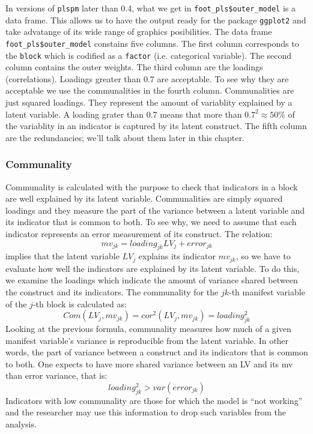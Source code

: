 \documentclass[12pt]{book}\usepackage{graphicx, color}
\newcommand{\plspm}{\texttt{plspm}}
\newcommand{\code}[1]{\texttt{#1}}
\begin{document}
In versions of \plspm{} later than 0.4, what we get in \code{foot\_pls\$outer\_model} is a data frame. This allows us to have the output ready for the package \code{ggplot2} and take advatange of its wide range of graphics posibilities. The data frame \code{foot\_pls\$outer\_model} constains five columns. The first column corresponds to the \code{block} which is codified as a \code{factor} (i.e. categorical variable). The second column contains the outer weights. The third column are the loadings (correlations). Loadings greater than 0.7 are acceptable. To see why they are acceptable we use the communalities in the fourth column. Communalities are just squared loadings. They represent the amount of variablity explained by a latent variable. A loading grater than 0.7 means that more than $0.7^2 \approx 50\%$ of the variablity in an indicator is captured by its latent construct. The fifth column are the redundancies; we'll talk about them later in this chapter.

\subsubsection*{Communality}
Communality is calculated with the purpose to check that indicators in a block are well explained by its latent variable. Communalities are simply squared loadings and they measure the part of the variance between a latent variable and its indicator that is common to both. To see why, we need to assume that each indicator represents an error measurement of its construct. The relation:
$$ mv_{jk} = loading_{jk}LV_{j} + error_{jk}$$
implies that the latent variable $LV_j$ explains its indicator $mv_{jk}$, so we have to evaluate how well the indicators are explained by its latent variable. To do this, we examine the loadings which indicate the amount of variance shared between the construct and its indicators. The communality for the $jk$-th manifest variable of the $j$-th block is calculated as:
$$ Com(LV_j, mv_{jk}) = cor^2(LV_j, mv_{jk}) = loading_{jk}^2 $$
Looking at the previous formula, communality measures how much of a given manifest variable's variance is reproducible from the latent variable. In other words, the part of variance between a construct and its indicators that is common to both. One expects to have more shared variance between an LV and its mv than error variance, that is:
$$ loading^2_{jk} > var(error_{jk}) $$
Indicators with low communality are those for which the model is ``not working'' and the researcher may use this information to drop such variables from the analysis.
\end{document}
